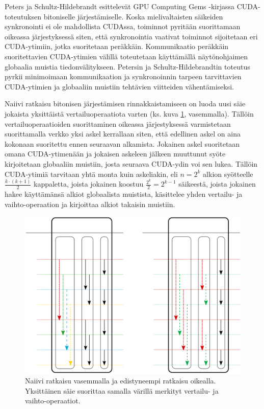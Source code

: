 \documentclass[a4paper,11pt]{article}
\begin{document}
Peters ja Schultz-Hildebrandt \cite{peters2012gems} esittelevät GPU Computing Gems -kirjassa CUDA-toteutuksen bitoniselle järjestämiselle. Koska mielivaltaisten säikeiden synkronointi ei ole mahdollista CUDAssa, toiminnot pyritään suorittamaan oikeassa järjestyksessä siten, että synkronointia vaativat toiminnot sijoitetaan eri CUDA-ytimiin, jotka suoritetaan peräkkäin. Kommunikaatio peräkkäin suoritettavien CUDA-ytimien välillä toteutetaan käyttämällä näytönohjaimen globaalia muistia tiedonvälitykseen. Petersin ja Schultz-Hildebrandtin toteutus pyrkii minimoimaan kommunikaation ja synkronoinnin tarpeen tarvittavien CUDA-ytimien ja globaaliin muistiin tehtävien viitteiden vähentämiseksi.

Naiivi ratkaisu bitonisen järjestämisen rinnakkaistamiseen on luoda uusi säie jokaista yksittäistä vertailuoperaatiota varten (ks. kuva \ref{fig:bitonic_divided}, vasemmalla). Tällöin vertailuoperaatioiden suorittaminen oikeassa järjestyksessä varmistetaan suorittamalla verkko yksi askel kerrallaan siten, että edellinen askel on aina kokonaan suoritettu ennen seuraavan alkamista. Jokainen askel suoritetaan omana CUDA-ytimenään ja jokaisen askeleen jälkeen muuttunut syöte kirjoitetaan globaaliin muistiin, josta seuraava CUDA-ydin voi sen lukea. Tällöin CUDA-ytimiä tarvitaan yhtä monta kuin askeliakin, eli $n = 2^k$ alkion syötteelle $\frac{k \cdot (k + 1)}{2}$ kappaletta, joista jokainen koostuu $\frac{2^k}{2} = 2^{k-1}$ säikeestä, joista jokainen hakee käyttämänsä alkiot globaalista muistista, käsittelee yhden vertailu- ja vaihto-operaation ja kirjoittaa alkiot takaisin muistiin.

\begin{figure}
\centering
\includegraphics[scale = 0.8]{bitonic_divided}
\caption{Naiivi ratkaisu vasemmalla ja edistyneempi ratkaisu oikealla. Yksittäinen säie suorittaa samalla värillä merkityt vertailu- ja vaihto-operaatiot.}
\label{fig:bitonic_divided}
\end{figure}
\end{document}
